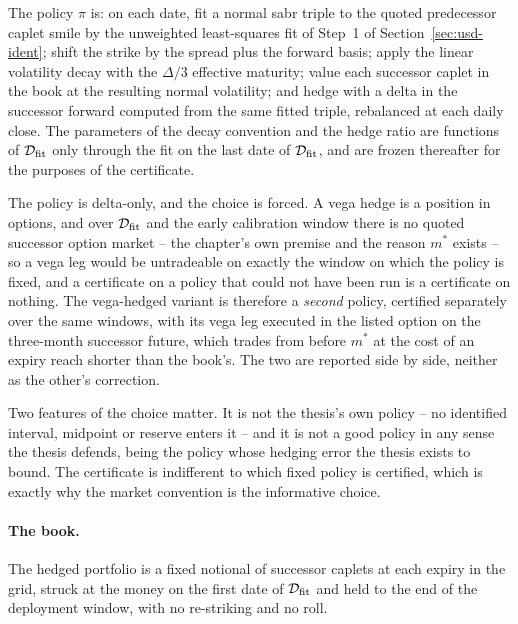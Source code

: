 \documentclass[../../../main.tex]{subfiles}
\begin{document}
\begin{definition}\label{def:usd-policy}
The policy $\pi$ is: on each date, fit a normal \gls{sabr} triple to the quoted predecessor caplet smile by the unweighted least-squares fit of Step~1 of Section~\ref{sec:usd-ident}; shift the strike by the spread plus the forward basis; apply the linear volatility decay with the $\Delta/3$ effective maturity; value each successor caplet in the book at the resulting normal volatility; and hedge with a delta in the successor forward computed from the same fitted triple, rebalanced at each daily close. The parameters of the decay convention and the hedge ratio are functions of $\mathcal D_{\mathrm{fit}}$ only through the fit on the last date of $\mathcal D_{\mathrm{fit}}$, and are frozen thereafter for the purposes of the certificate.
\end{definition}

The policy is delta-only, and the choice is forced. A vega hedge is a position in options, and over $\mathcal D_{\mathrm{fit}}$ and the early calibration window there is no quoted successor option market -- the chapter's own premise and the reason $m^*$ exists -- so a vega leg would be untradeable on exactly the window on which the policy is fixed, and a certificate on a policy that could not have been run is a certificate on nothing. The vega-hedged variant is therefore a \emph{second} policy, certified separately over the same windows, with its vega leg executed in the listed option on the three-month successor future, which trades from before $m^*$ at the cost of an expiry reach shorter than the book's. The two are reported side by side, neither as the other's correction.

Two features of the choice matter. It is not the thesis's own policy -- no identified interval, midpoint or reserve enters it -- and it is not a good policy in any sense the thesis defends, being the policy whose hedging error the thesis exists to bound. The certificate is indifferent to which fixed policy is certified, which is exactly why the market convention is the informative choice.

\paragraph{The book.} The hedged portfolio is a fixed notional of successor caplets at each expiry in the grid, struck at the money on the first date of $\mathcal D_{\mathrm{fit}}$ and held to the end of the deployment window, with no re-striking and no roll.
\end{document}
